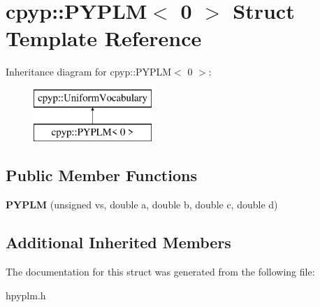 \hypertarget{structcpyp_1_1_p_y_p_l_m_3_010_01_4}{}\section{cpyp\+:\+:P\+Y\+P\+LM$<$ 0 $>$ Struct Template Reference}
\label{structcpyp_1_1_p_y_p_l_m_3_010_01_4}
Inheritance diagram for cpyp\+:\+:P\+Y\+P\+LM$<$ 0 $>$\+:\begin{figure}[H]
\begin{center}
\leavevmode
\includegraphics[height=2.000000cm]{structcpyp_1_1_p_y_p_l_m_3_010_01_4}
\end{center}
\end{figure}
\subsection*{Public Member Functions}
\begin{DoxyCompactItemize}
\item 
\mbox{\label{structcpyp_1_1_p_y_p_l_m_3_010_01_4_ab145872943e246a33b1614e5fa86c56c}} 
{\bfseries P\+Y\+P\+LM} (unsigned vs, double a, double b, double c, double d)
\end{DoxyCompactItemize}
\subsection*{Additional Inherited Members}


The documentation for this struct was generated from the following file\+:\begin{DoxyCompactItemize}
\item 
hpyplm.\+h\end{DoxyCompactItemize}
